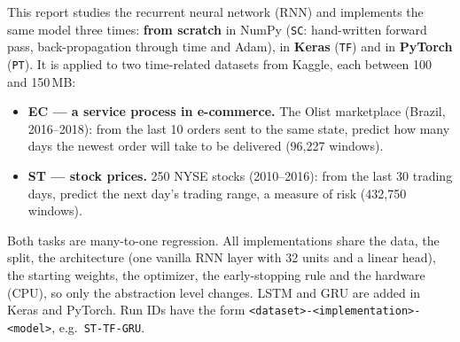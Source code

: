 \documentclass[11pt, a4paper]{article}
\newcommand{\run}[1]{\texttt{#1}}
\begin{document}
This report studies the recurrent neural network (RNN) and implements the same model three times: \textbf{from scratch} in NumPy (\run{SC}: hand-written
forward pass, back-propagation through time and Adam), in \textbf{Keras} (\run{TF}) and in \textbf{PyTorch} (\run{PT}). It is applied to two time-related
datasets from Kaggle, each between 100 and 150\,MB:
\begin{itemize}
\item \textbf{EC — a service process in e-commerce.} The Olist marketplace (Brazil, 2016--2018): from the last 10 orders sent to the same state,
  predict how many days the newest order will take to be delivered (96{,}227 windows).
\item \textbf{ST — stock prices.} 250 NYSE stocks (2010--2016): from the last 30 trading days, predict the next day's trading range, a measure of risk
  (432{,}750 windows).
\end{itemize}
Both tasks are many-to-one regression. All implementations share the data, the split, the architecture (one vanilla RNN layer with 32 units and a
linear head), the starting weights, the optimizer, the early-stopping rule and the hardware (CPU), so only the abstraction level changes.
LSTM and GRU are added in Keras and PyTorch. Run IDs have the form \run{<dataset>-<implementation>-<model>}, e.g.\ \run{ST-TF-GRU}.

\begin{table}[H]
\centering
\caption{All 14 runs, test period. RMSE in days (EC, top) and in percentage points of daily range (ST, bottom); $R^2$ is out-of-sample against the
train mean; s/epoch = median time per epoch on CPU.}
\label{tab:summary}
\small

\end{table}
\end{document}
